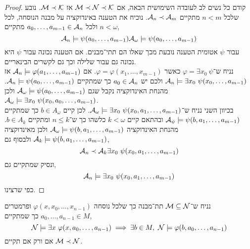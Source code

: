 \begin{proof}
	קודם כל נשים לב לעובדה השימושית הבאה, אם $\mathcal{M} \prec \mathcal{N} \prec \mathcal{K}$ אז $\mathcal{M} \prec \mathcal{K}$.
	נובע שלכל $n < m$ מתקיים $\mathcal{A}_n \prec \mathcal{A}_m$.
	נוכיח את הטענה באינדוקציה על מבנה הנוסחה, לכל $n < \omega$ ולכל $a_0, \ldots, a_{m - 1} \in \mathcal{A}_n$ מתקיים,
	\[
		\mathcal{A}_n \models \psi(a_0, \ldots, a_{m - 1})
		\mathcal{A}_{\omega} \models \psi(a_0, \ldots, a_{m - 1})
	\]
	עבור $\psi$ אטומית הטענה נובעת מכך שאלו הם תתי־מבנים.
	אם הטענה נכונה עבור $\psi$ היא נכונה גם עבור שלילה וכך גם לקשרים הבינאריים. \\
	נניח ש־$\varphi = \exists x_0\ \psi$ כאשר $\varphi = \varphi(x_1, \ldots, x_{m - 1})$.
	אם $\mathcal{A}_n \models \varphi(a_1, \ldots, a_{m - 1})$ אז $\Aa_n \models \exists x_0\ \psi(x_0, \ldots, a_{m - 1})$ ולכם יש $a_0 \in \mathcal{A}_n$ כך שמתקיים $\mathcal{A}_n \models \psi(a_0, \ldots, a_{m - 1})$.
	מהנחת האינדוקציה נקבל שגם $\mathcal{A}_{\omega} \models \psi(a_0, \ldots, a_{m - 1})$ ולכן $\mathcal{A}_{\omega} \models \exists x_0\ \psi(x_0, a_0, \ldots, a_{m - 1})$. \\
	בכיוון השני נניח ש־$\mathcal{A}_{\omega} \models \exists x_0\ \psi(x_0, a_1, \ldots, a_{m - 1})$.
	לכן קיים $b \in A_{\omega}$ כך שמתקיים $\mathcal{A}_{\psi} \models \psi(b, a_1, \ldots, a_{m - 1})$ ובהתאם קיים $k < \omega$ כלשהו כך ש־$n \le k$ ומתקיים $b \in A_k$.
	מהנחת האינדוקציה $\mathcal{A}_{\omega} \models \psi(b, a_1, \ldots, a_{m - 1})$ ולכן מאינדוקציה $\mathcal{A}_k \models \psi(b, a_1, \ldots, a_{m - 1})$ ולבסוף גם,
	\[
		\mathcal{A}_n \prec \mathcal{A}_k \exists x_0\ \psi(x_0, a_1, \ldots, a_{m - 1})
	\]
	ונסיק שמתקיים גם,
	\[
		\mathcal{A}_n \models \exists x_0\ \psi(x_0, a_1, \ldots, a_{m - 1})
	\]
	כפי שרצינו.
\end{proof}
\begin{theorem}
	נניח ש־$\mathcal{M} \subseteq \mathcal{N}$ תת־מבנה כך שלכל נוסחה $\varphi(x, x_0, \ldots, x_{n - 1})$ ופרמטרים $a_0, \ldots, a_{n - 1} \in M$ כך שמתקיים,
	\[
		\Nn \models \exists x\ \varphi(x, a_0, \ldots, a_{n - 1})
		\implies \exists b \in M,\ \Nn \models \varphi(b, a_0, \ldots, a_{n - 1})
	\]
	אם ורק אם תקיים $\mathcal{M} \prec \mathcal{N}$.
\end{theorem}

